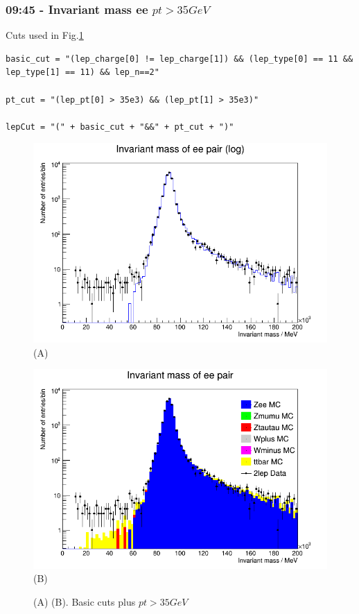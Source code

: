 \subsubsection*{09:45 - Invariant mass ee $pt > 35 GeV $}
Cuts used in Fig.\ref{fig:09:45_02-03-21}
\begin{lstlisting}
basic_cut = "(lep_charge[0] != lep_charge[1]) && (lep_type[0] == 11 && lep_type[1] == 11) && lep_n==2"

pt_cut = "(lep_pt[0] > 35e3) && (lep_pt[1] > 35e3)"
    
lepCut = "(" + basic_cut + "&&" + pt_cut + ")"
\end{lstlisting}
\begin{figure}[h!]
    \centering
    \begin{minipage}{0.5\textwidth}
        \centering
        \includegraphics[width=\linewidth]{plots/02-03-2021/09-46_2Stack.png}
        (A)
    \end{minipage}\hfill
    \begin{minipage}{0.5\textwidth}
        \centering
        \includegraphics[width=\linewidth]{plots/02-03-2021/09-45_AllStack.png}
        (B)
    \end{minipage}
    \caption{(A)  (B). Basic cuts plus $pt > 35 GeV $}
    \label{fig:09:45_02-03-21}
\end{figure}

